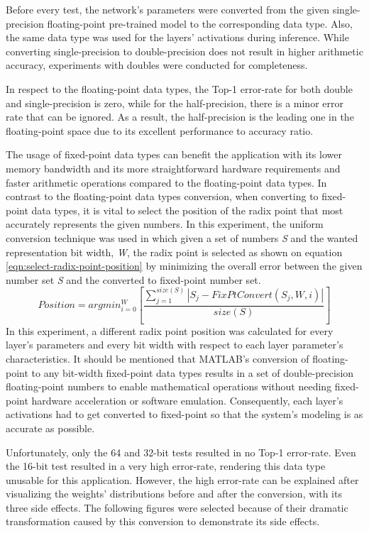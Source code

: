Before every test, the network's parameters were converted from the given single-precision floating-point pre-trained model to the corresponding data type. Also, the same data type was used for the layers' activations during inference. While converting single-precision to double-precision does not result in higher arithmetic accuracy, experiments with doubles were conducted for completeness.

In respect to the floating-point data types, the Top-1 error-rate for both double and single-precision is zero, while for the half-precision, there is a minor error rate that can be ignored. As a result, the half-precision is the leading one in the floating-point space due to its excellent performance to accuracy ratio.

The usage of fixed-point data types can benefit the application with its lower memory bandwidth and its more straightforward hardware requirements and faster arithmetic operations compared to the floating-point data types. In contrast to the floating-point data types conversion, when converting to fixed-point data types, it is vital to select the position of the radix point that most accurately represents the given numbers. In this experiment, the uniform conversion technique was used in which given a set of numbers \emph{S} and the wanted representation bit width, \emph{W}, the radix point is selected as shown on equation \ref{eqn:select-radix-point-position} by minimizing the overall error between the given number set \emph{S} and the converted to fixed-point number set.
\begin{equation}
	\label{eqn:select-radix-point-position}
	Position = argmin_{i=0}^{W}[\frac{\sum_{j=1}^{size(S)} |S_j - FixPtConvert(S_j, W, i)| }{size(S)}]
\end{equation}
In this experiment, a different radix point position was calculated for every layer's parameters and every bit width with respect to each layer parameter's characteristics. It should be mentioned that MATLAB's conversion of floating-point to any bit-width fixed-point data types results in a set of double-precision floating-point numbers to enable mathematical operations without needing fixed-point hardware acceleration or software emulation. Consequently, each layer's activations had to get converted to fixed-point so that the system's modeling is as accurate as possible.

Unfortunately, only the 64 and 32-bit tests resulted in no Top-1 error-rate. Even the 16-bit test resulted in a very high error-rate, rendering this data type unusable for this application. However, the high error-rate can be explained after visualizing the weights' distributions before and after the conversion, with its three side effects. The following figures were selected because of their dramatic transformation caused by this conversion to demonstrate its side effects.

